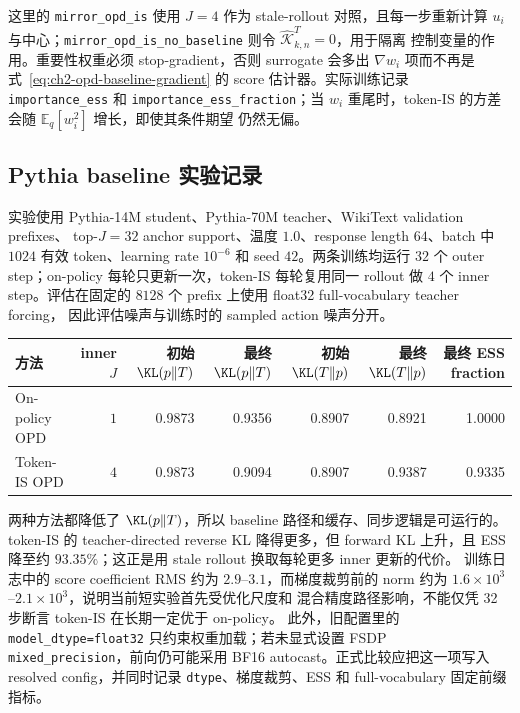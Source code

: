 这里的 \texttt{mirror\_opd\_is} 使用 $J=4$ 作为 stale-rollout 对照，且每一步重新计算
$u_i$ 与中心；\texttt{mirror\_opd\_is\_no\_baseline} 则令 $\widehat{\mathcal K}_{k,n}^{T}=0$，用于隔离
控制变量的作用。重要性权重必须 stop-gradient，否则 surrogate 会多出
$\nabla w_i$ 项而不再是式~\eqref{eq:ch2-opd-baseline-gradient} 的 score
估计器。实际训练记录 \texttt{importance\_ess} 和 \texttt{importance\_ess\_fraction}；当
$w_i$ 重尾时，token-IS 的方差会随 $\mathbb E_q[w_i^2]$ 增长，即使其条件期望
仍然无偏。

\subsection{Pythia baseline 实验记录}
\label{subsec:ch2-opd-baseline-results}

实验使用 Pythia-14M student、Pythia-70M teacher、WikiText validation prefixes、
top-$J=32$ anchor support、温度 $1.0$、response length $64$、batch 中 $1024$
有效 token、learning rate $10^{-6}$ 和 seed $42$。两条训练均运行 $32$ 个 outer
step；on-policy 每轮只更新一次，token-IS 每轮复用同一 rollout 做 $4$ 个 inner
step。评估在固定的 $8128$ 个 prefix 上使用 float32 full-vocabulary teacher forcing，
因此评估噪声与训练时的 sampled action 噪声分开。

\begin{center}
\begin{tabular}{lrrrrrr}
\toprule
方法 & inner $J$ & 初始 $\KL(p\Vert T)$ & 最终 $\KL(p\Vert T)$ & 初始 $\KL(T\Vert p)$ & 最终 $\KL(T\Vert p)$ & 最终 ESS fraction\\
\midrule
On-policy OPD & $1$ & 0.9873 & 0.9356 & 0.8907 & 0.8921 & 1.0000\\
Token-IS OPD & $4$ & 0.9873 & 0.9094 & 0.8907 & 0.9387 & 0.9335\\
\bottomrule
\end{tabular}
\end{center}

两种方法都降低了 $\KL(p\Vert T)$，所以 baseline 路径和缓存、同步逻辑是可运行的。
token-IS 的 teacher-directed reverse KL 降得更多，但 forward KL 上升，且 ESS
降至约 $93.35\%$；这正是用 stale rollout 换取每轮更多 inner 更新的代价。
训练日志中的 score coefficient RMS 约为 $2.9$--$3.1$，而梯度裁剪前的 norm
约为 $1.6\times10^3$--$2.1\times10^3$，说明当前短实验首先受优化尺度和
混合精度路径影响，不能仅凭 32 步断言 token-IS 在长期一定优于 on-policy。
此外，旧配置里的 \texttt{model\_dtype=float32} 只约束权重加载；若未显式设置 FSDP
\texttt{mixed\_precision}，前向仍可能采用 BF16 autocast。正式比较应把这一项写入 resolved
config，并同时记录 \texttt{dtype}、梯度裁剪、ESS 和 full-vocabulary 固定前缀指标。
